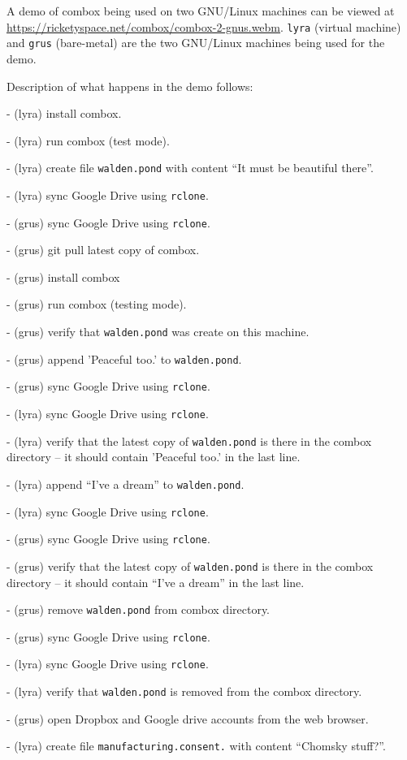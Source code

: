 A demo of combox being used on two GNU/Linux machines can be viewed at
\url{https://ricketyspace.net/combox/combox-2-gnus.webm}. \verb+lyra+
(virtual machine) and \verb+grus+ (bare-metal) are the two GNU/Linux
machines being used for the demo.

Description of what happens in the demo follows:

- (lyra) install combox.

- (lyra) run combox (test mode).

- (lyra) create file \verb+walden.pond+ with content ``It must be
beautiful there''.

- (lyra) sync Google Drive using \verb+rclone+.

- (grus) sync Google Drive using \verb+rclone+.

- (grus) git pull latest copy of combox.

- (grus) install combox

- (grus) run combox (testing mode).

- (grus) verify that \verb+walden.pond+ was create on this machine.

- (grus) append 'Peaceful too.' to \verb+walden.pond+.

- (grus) sync Google Drive using \verb+rclone+.

- (lyra) sync Google Drive using \verb+rclone+.

- (lyra) verify that the latest copy of \verb+walden.pond+ is there in
the combox directory -- it should contain 'Peaceful too.' in the last
line.

- (lyra) append ``I've a dream'' to \verb+walden.pond+.

- (lyra) sync Google Drive using \verb+rclone+.

- (grus) sync Google Drive using \verb+rclone+.

- (grus) verify that the latest copy of \verb+walden.pond+ is there in
the combox directory -- it should contain ``I've a dream'' in the last
line.

- (grus) remove \verb+walden.pond+ from combox directory.

- (grus) sync Google Drive using \verb+rclone+.

- (lyra) sync Google Drive using \verb+rclone+.

- (lyra) verify that \verb+walden.pond+ is removed from the combox
directory.

- (grus) open Dropbox and Google drive accounts from the web browser.

- (lyra) create file \verb+manufacturing.consent.+ with content
``Chomsky stuff?''.

